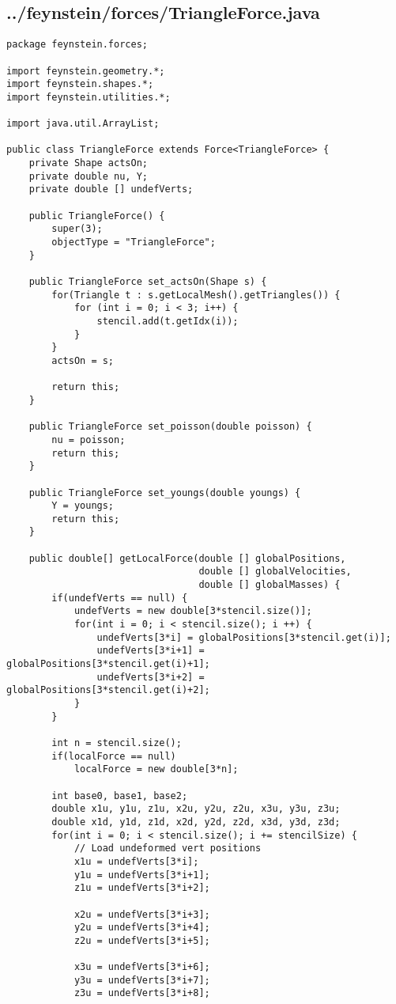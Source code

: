 \subsection*{../feynstein/forces/TriangleForce.java}
\begin{lstlisting}
package feynstein.forces;

import feynstein.geometry.*;
import feynstein.shapes.*;
import feynstein.utilities.*;

import java.util.ArrayList;

public class TriangleForce extends Force<TriangleForce> {
    private Shape actsOn;
    private double nu, Y;
	private double [] undefVerts;
	
    public TriangleForce() {
		super(3);
		objectType = "TriangleForce";
    }

    public TriangleForce set_actsOn(Shape s) {
		for(Triangle t : s.getLocalMesh().getTriangles()) {
			for (int i = 0; i < 3; i++) {
				stencil.add(t.getIdx(i));
			}
		}
		actsOn = s;
		
		return this;
    }

    public TriangleForce set_poisson(double poisson) {
		nu = poisson;
		return this;
    }

    public TriangleForce set_youngs(double youngs) {
		Y = youngs;
		return this;
    }
	
	public double[] getLocalForce(double [] globalPositions,
								  double [] globalVelocities,
								  double [] globalMasses) {
		if(undefVerts == null) {
			undefVerts = new double[3*stencil.size()];
			for(int i = 0; i < stencil.size(); i ++) {
				undefVerts[3*i] = globalPositions[3*stencil.get(i)];
				undefVerts[3*i+1] = globalPositions[3*stencil.get(i)+1];
				undefVerts[3*i+2] = globalPositions[3*stencil.get(i)+2];
			}
		}
		
		int n = stencil.size();
		if(localForce == null)
			localForce = new double[3*n];
		
		int base0, base1, base2;
		double x1u, y1u, z1u, x2u, y2u, z2u, x3u, y3u, z3u;
		double x1d, y1d, z1d, x2d, y2d, z2d, x3d, y3d, z3d;
		for(int i = 0; i < stencil.size(); i += stencilSize) {
			// Load undeformed vert positions
			x1u = undefVerts[3*i];
			y1u = undefVerts[3*i+1];
			z1u = undefVerts[3*i+2];
			
			x2u = undefVerts[3*i+3];
			y2u = undefVerts[3*i+4];
			z2u = undefVerts[3*i+5];
			
			x3u = undefVerts[3*i+6];
			y3u = undefVerts[3*i+7];
			z3u = undefVerts[3*i+8];
			

\end{lstlisting}
